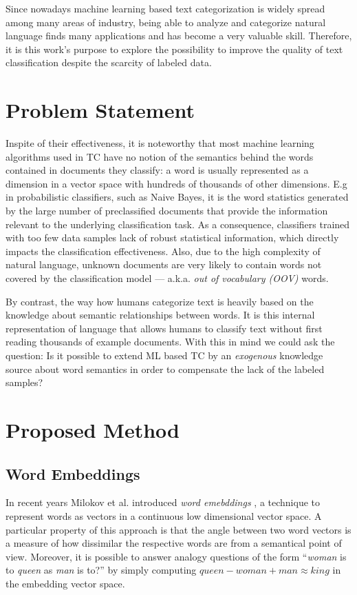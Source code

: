 Since nowadays machine learning based text categorization is widely spread
among many areas of industry, being able to analyze and categorize natural
language finds many applications and has become a very valuable skill. 
Therefore, it is this work's purpose to explore the possibility to improve 
the quality of text classification despite the scarcity of labeled data.

\section{Problem Statement}

Inspite of their effectiveness, it is noteworthy that most machine learning
algorithms used in TC have no notion of the semantics behind the words
contained in documents they classify: a word is usually represented as a dimension
in a vector space with hundreds of thousands of other dimensions. E.g in
probabilistic classifiers, such as Naive Bayes, it is the word statistics
generated by the large number of preclassified documents that provide the information relevant to the
underlying classification task.
As a consequence, classifiers trained with too few data samples lack of
robust statistical information, which directly impacts the classification
effectiveness. Also, due to the high complexity of natural language,
unknown documents are very likely to contain words not covered by the
classification model --- a.k.a. \emph{out of vocabulary (OOV)} words.

By contrast, the way how humans categorize text is heavily based on the
knowledge about semantic relationships between words. It is this internal representation
of language that allows humans to classify text without first reading thousands of example documents. 
With this in mind we could ask the question: Is it possible to extend ML
based TC by an \emph{exogenous} knowledge source about word semantics in order
to compensate the lack of the labeled samples?

\section{Proposed Method}
\label{sec:introduction:proposed-method}
\subsection{Word Embeddings}
In recent years Milokov et al. introduced \emph{word emebddings}
\cite{mikolov2013distributed}, a technique to represent words as vectors in a continuous low dimensional vector space. 
A particular property of this approach is that the angle
between two word vectors is a measure of how dissimilar the respective words are from a
semantical point of view.
Moreover, it is possible to answer analogy questions of the form ``\emph{woman} is to
 \emph{queen} as \emph{man} is to?'' by simply computing $\mathit{queen} - \mathit{woman} +
\mathit{man} \approx \mathit{king}$ in the embedding vector space. 

